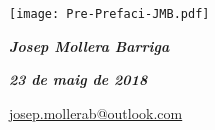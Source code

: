 \vspace*{1cm}
\hfill
\begin{minipage}[b]{35mm}
    \texttt{[image: Pre-Prefaci-JMB.pdf]}
\end{minipage}

{\large

    \hfill \textbf{\textsl{Josep Mollera Barriga}}

    \hfill \textbf{\textsl{23 de maig de 2018}}

    \hfill {\small \href{mailto:josep.mollerab@outlook.com}{\faEnvelope\hspace{2mm}josep.mollerab@outlook.com} }

}
